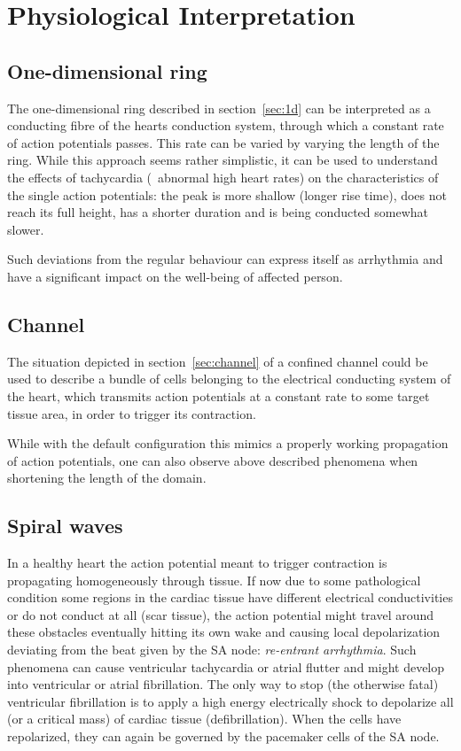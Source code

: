 \section{Physiological Interpretation}
\label{sec:phys}
\subsection{One-dimensional ring}
The one-dimensional ring described in section~\ref{sec:1d} can be interpreted
as a conducting fibre of the hearts conduction system, through which a constant
rate of action potentials passes. This rate can be varied by varying the length
of the ring. While this approach seems rather simplistic, it can be used to
understand the effects of tachycardia (\ie~abnormal high heart rates) on the
characteristics of the single action potentials: the peak is more shallow
(longer rise time), does not reach its full height, has a shorter duration and
is being conducted somewhat slower.

Such deviations from the regular behaviour can express itself as arrhythmia and
have a significant impact on the well-being of affected person.


\subsection{Channel}
The situation depicted in section~\ref{sec:channel} of a confined channel could
be used to describe a bundle of cells belonging to the electrical conducting
system of the heart, which transmits action potentials at a constant rate to
some target tissue area, in order to trigger its contraction.

While with the default configuration this mimics a properly working propagation
of action potentials, one can also observe above described phenomena when
shortening the length of the domain.


\subsection{Spiral waves}
In a healthy heart the action potential meant to trigger contraction is
propagating homogeneously through tissue. If now due to some pathological
condition some regions in the cardiac tissue have different electrical
conductivities or do not conduct at all (scar tissue), the action potential
might travel around these obstacles eventually hitting its own wake and causing
local depolarization deviating from the beat given by the SA node:
\emph{re-entrant arrhythmia}. Such phenomena can cause ventricular tachycardia
or atrial flutter and might develop into ventricular or atrial fibrillation.
The only way to stop (the otherwise fatal) ventricular fibrillation is to
apply a high energy electrically shock to depolarize all (or a
critical mass) of cardiac tissue (defibrillation). When the cells have
repolarized, they can again be governed by the pacemaker cells of the SA node.

